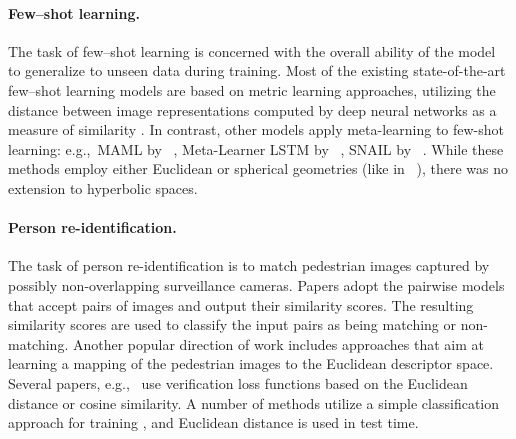 \documentclass[10pt,twocolumn,letterpaper]{article}
\begin{document}
\paragraph{Few--shot learning.} 
The task of few--shot learning is concerned with the overall ability of the model to generalize to unseen data during training. Most of the existing state-of-the-art few--shot learning models are based on metric learning approaches, utilizing the distance between image representations computed by deep neural networks as a measure of similarity \cite{nips2016_vinyals2016matching_net,snell2017prototypical_net,sung2018relation_net,nichol2018reptile,chen2018a,chu_cvpr2019_spot_and_learn,li_cvpr2019_revisiting,bauer2017discriminative_k_shot,rusu2018LEO,chen2019aug_few_shot}. In contrast, other models apply meta-learning to few-shot learning: e.g.,\ MAML  by ~\cite{finn2017maml}, Meta-Learner LSTM by ~\cite{ravi2016optimization}, SNAIL by ~\cite{mishra2017snail}. While these methods employ either Euclidean or spherical geometries (like in ~\cite{nips2016_vinyals2016matching_net}), there was no extension to hyperbolic spaces. 
\vspace{-5mm}
\paragraph{Person re-identification.} 
The task of person re-identification is to match pedestrian images captured by possibly non-overlapping surveillance cameras. 
Papers \cite{ahmed2015improved, guo2018efficient, wang2018person} adopt the pairwise models that accept pairs of images and output their similarity scores. The resulting similarity scores are used to classify the input pairs as being matching or non-matching. 
Another popular direction of work includes approaches that aim at learning a mapping of the pedestrian images to the Euclidean descriptor space. Several papers, e.g.,\ \cite{suh2018part,Yi14} use verification loss functions based on the Euclidean distance or cosine similarity.  
A number of methods utilize a simple classification approach for training \cite{chang2018multi, su2017pose,kalayeh2018human,zhao2017spindle}, and Euclidean distance is used in test time. 
%
\end{document}
